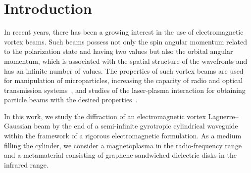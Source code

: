 \documentclass[conference,a4paper]{IEEEtran}
\begin{document}
\section{Introduction}
In recent years, there has been a growing interest in the use of electromagnetic vortex beams. Such beams possess not only the spin angular momentum related to the polarization state and having two values but also the orbital angular momentum, which is associated with the spatial structure of the wavefronts and has an infinite number of values. The properties of such vortex beams are used for manipulation of microparticles, increasing the capacity of radio and optical transmission systems~\cite{b8}, and studies of the laser-plasma interaction for obtaining particle beams with the desired properties~\cite{b9,b10,b11}.

In this work, we study the diffraction of an electromagnetic vortex Laguerre--Gaussian beam by the end of a semi-infinite gyrotropic cylindrical waveguide within the framework of a rigorous electromagnetic formulation. As a medium filling the cylinder, we consider a magnetoplasma in the radio-frequency range and a metamaterial consisting of graphene-sandwiched dielectric disks in the infrared range.
\end{document}
